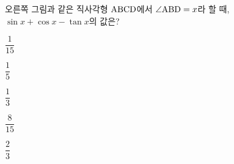 \noindent\begin{minipage}[t]{0.58\linewidth}\vspace{0pt}\raggedright 오른쪽 그림과 같은 직사각형 $\mathrm{ABCD}$에서 $\angle\mathrm{ABD}=x$라 할 때, $\sin x+\cos x-\tan x$의 값은?\end{minipage}\hfill\begin{minipage}[t]{0.4\linewidth}\vspace{0pt}\centering \resizebox{\ifdim\width>\linewidth\linewidth\else\width\fi}{!}{}\end{minipage}\par
\begin{choicesii}{\rule[-3ex]{0pt}{8ex}$\dfrac{1}{15}$}{\rule[-3ex]{0pt}{8ex}$\dfrac{1}{5}$}{\rule[-3ex]{0pt}{8ex}$\dfrac{1}{3}$}{\rule[-3ex]{0pt}{8ex}$\dfrac{8}{15}$}{\rule[-3ex]{0pt}{8ex}$\dfrac{2}{3}$}\end{choicesii}
